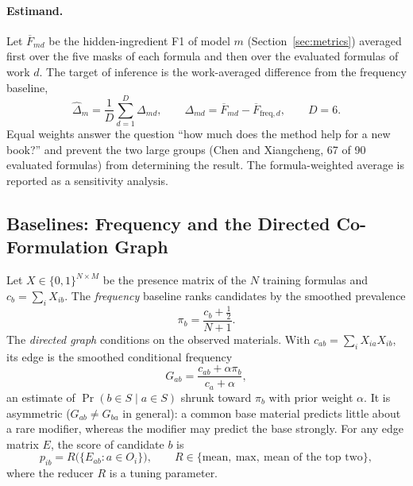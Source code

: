 \documentclass[applsci,article,submit,oneauthor]{Definitions/mdpi}
\begin{document}
\paragraph{Estimand.} Let $\overline{F}_{md}$ be the hidden-ingredient F1 of model $m$ (Section~\ref{sec:metrics}) averaged first over the five masks of each formula and then over the evaluated formulas of work $d$. The target of inference is the work-averaged difference from the frequency baseline,
\begin{equation}
\widehat\Delta_m=\frac1D\sum_{d=1}^{D}\Delta_{md},\qquad \Delta_{md}=\overline F_{md}-\overline F_{\mathrm{freq},d},\qquad D=6.
\label{eq:estimand}
\end{equation}
Equal weights answer the question ``how much does the method help for a new book?'' and prevent the two large groups (Chen and Xiangcheng, 67 of 90 evaluated formulas) from determining the result. The formula-weighted average is reported as a sensitivity analysis.

\subsection{Baselines: Frequency and the Directed Co-Formulation Graph}
\label{sec:baselines}

Let $X\in\{0,1\}^{N\times M}$ be the presence matrix of the $N$ training formulas and $c_b=\sum_iX_{ib}$. The \emph{frequency} baseline ranks candidates by the smoothed prevalence
\begin{equation}
\pi_b=\frac{c_b+\frac12}{N+1}.
\label{eq:prev}
\end{equation}
The \emph{directed graph} conditions on the observed materials. With $c_{ab}=\sum_iX_{ia}X_{ib}$, its edge is the smoothed conditional frequency
\begin{equation}
G_{ab}=\frac{c_{ab}+\alpha\pi_b}{c_a+\alpha},
\label{eq:graph}
\end{equation}
an estimate of $\Pr(b\in S\mid a\in S)$ shrunk toward $\pi_b$ with prior weight $\alpha$. It is asymmetric ($G_{ab}\neq G_{ba}$ in general): a common base material predicts little about a rare modifier, whereas the modifier may predict the base strongly. For any edge matrix $E$, the score of candidate $b$ is
\begin{equation}
p_{ib}=R\bigl(\{E_{ab}:a\in O_i\}\bigr),\qquad R\in\{\text{mean},\ \text{max},\ \text{mean of the top two}\},
\label{eq:reducer}
\end{equation}
where the reducer $R$ is a tuning parameter.
\end{document}
